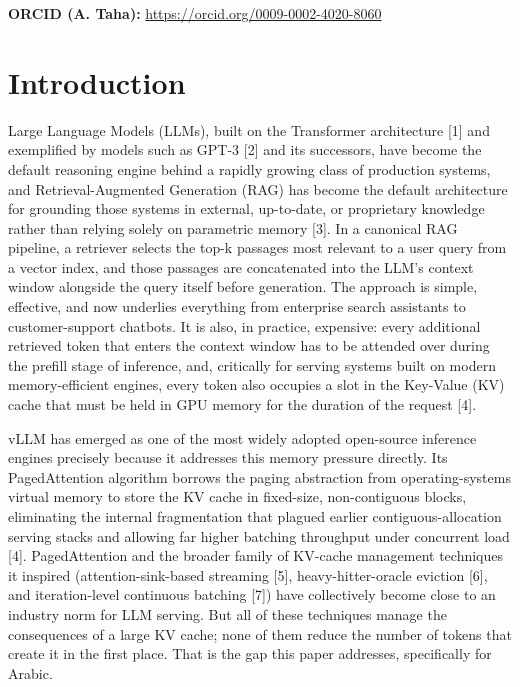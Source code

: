 \documentclass[pdflatex,sn-basic,Numbered]{sn-jnl}
\begin{document}

\maketitle

\noindent\textbf{ORCID (A. Taha):} \href{https://orcid.org/0009-0002-4020-8060}{https://orcid.org/0009-0002-4020-8060}

\section{Introduction}
Large Language Models (LLMs), built on the Transformer architecture [1] and exemplified by models such as GPT-3 [2] and its successors, have become the default reasoning engine behind a rapidly growing class of production systems, and Retrieval-Augmented Generation (RAG) has become the default architecture for grounding those systems in external, up-to-date, or proprietary knowledge rather than relying solely on parametric memory [3]. In a canonical RAG pipeline, a retriever selects the top-k passages most relevant to a user query from a vector index, and those passages are concatenated into the LLM's context window alongside the query itself before generation. The approach is simple, effective, and now underlies everything from enterprise search assistants to customer-support chatbots. It is also, in practice, expensive: every additional retrieved token that enters the context window has to be attended over during the prefill stage of inference, and, critically for serving systems built on modern memory-efficient engines, every token also occupies a slot in the Key-Value (KV) cache that must be held in GPU memory for the duration of the request [4].

vLLM has emerged as one of the most widely adopted open-source inference engines precisely because it addresses this memory pressure directly. Its PagedAttention algorithm borrows the paging abstraction from operating-systems virtual memory to store the KV cache in fixed-size, non-contiguous blocks, eliminating the internal fragmentation that plagued earlier contiguous-allocation serving stacks and allowing far higher batching throughput under concurrent load [4]. PagedAttention and the broader family of KV-cache management techniques it inspired (attention-sink-based streaming [5], heavy-hitter-oracle eviction [6], and iteration-level continuous batching [7]) have collectively become close to an industry norm for LLM serving. But all of these techniques manage the consequences of a large KV cache; none of them reduce the number of tokens that create it in the first place. That is the gap this paper addresses, specifically for Arabic.
\end{document}
